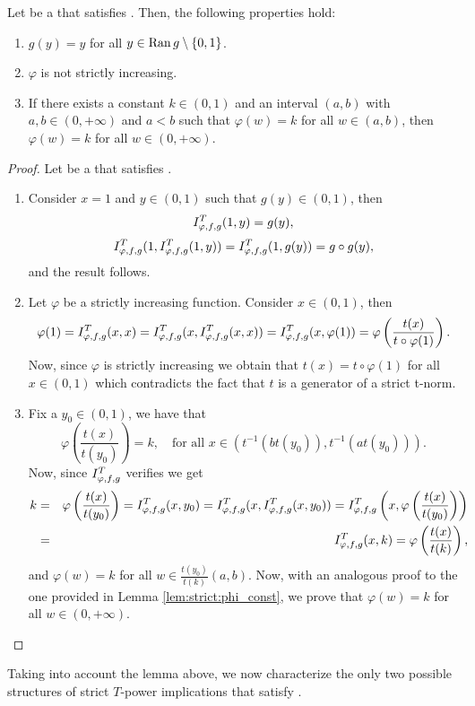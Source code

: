 \begin{lemma}\label{lem:strict:(IB)}
	Let \IT be a \STP that satisfies \IB. Then, the following properties hold:
	\begin{enumerate}[label=(\roman*)]
		\item $g(y)=y$ for all $y \in \operatorname{Ran} g \setminus \{0,1\}$.
		\item $\varphi$ is not strictly increasing.
		\item If there exists a constant $k \in (0,1)$ and an interval $(a,b)$ with $a,b \in (0,+\infty)$ and $a<b$ such that $\varphi(w)=k$ for all $w \in (a,b)$, then $\varphi(w)=k$ for all $w \in (0,+\infty)$.
	\end{enumerate}
\end{lemma}
\begin{proof} Let \IT be a \STP that satisfies \IB.
	\begin{enumerate}[label=(\roman*)]
		\item Consider $x=1$ and $y \in (0,1)$ such that $g(y) \in (0,1)$, then
		$$ I^T_{\varphi,f,g}(1,y)=g(y),$$
		$$ I^T_{\varphi,f,g}(1,I^T_{\varphi,f,g}(1,y))=I^T_{\varphi,f,g}(1,g(y))=g \circ g (y),$$
		and the result follows.
		\item Let $\varphi$ be a strictly increasing function. Consider $x \in (0,1)$, then
		$$\varphi(1)=I^T_{\varphi,f,g}(x,x)=I^T_{\varphi,f,g}(x,I^T_{\varphi,f,g}(x,x))=I^T_{\varphi,f,g}(x,\varphi(1))=\varphi \left(\frac{t(x)}{t \circ \varphi(1)}\right).$$
		Now, since $\varphi$ is strictly increasing we obtain that $t(x)=t\circ \varphi (1)$ for all $x\in (0,1)$ which contradicts the fact that $t$ is a generator of a strict t-norm.
		\item  	Fix a $y_0 \in (0,1)$, we have that
		$$ \varphi \left(\frac{t(x)}{t(y_0)}\right)=k, \quad \text{for all } x \in (t^{-1}(bt(y_0)),t^{-1}(at(y_0))).$$
		Now, since $I^T_{\varphi,f,g}$ verifies \IB we get
		\begin{eqnarray*}
		k &= & \varphi\left(\frac{t(x)}{t(y_0)}\right)=I^T_{\varphi,f,g}(x,y_0)=I^T_{\varphi,f,g}(x,I^T_{\varphi,f,g}(x,y_0))=I^T_{\varphi,f,g}\left(x,\varphi\left(\frac{t(x)}{t(y_0)}\right)\right) \\
		&=& I^T_{\varphi,f,g}(x,k)=\varphi\left(\frac{t(x)}{t(k)}\right),
		\end{eqnarray*}
		and $\varphi(w)=k$ for all $w \in \frac{t(y_0)}{t(k)}(a,b)$. Now, with  an analogous proof to the one provided in Lemma \ref{lem:strict:phi_const}, we prove that $\varphi(w)=k$ for all $w \in (0,+\infty)$. \qedhere
	\end{enumerate}
\end{proof}
Taking into account the lemma above, we now characterize the only two possible structures of strict $T$-power implications that satisfy \IB.
